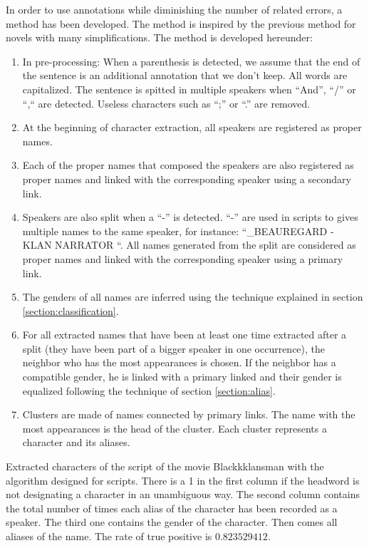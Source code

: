 \documentclass[a4paper, 12pt]{report}
\begin{document}
In order to use annotations while diminishing the number of related errors, a method has been developed.
The method is inspired by the previous method for novels with many simplifications. The method is developed hereunder:
\begin{enumerate}
\item In pre-processing: When a parenthesis is detected, we assume that the end of the sentence is an additional annotation that we don't keep. All words are capitalized. The sentence is spitted in multiple speakers when ``And'', ``/'' or ``,`` are detected. Useless characters such as ``;'' or ``.'' are removed.
\item At the beginning of character extraction, all speakers are registered as proper names.
\item Each of the proper names that composed the speakers are also registered as proper names and linked with the corresponding speaker using a secondary link.
\item Speakers are also split when a ``-'' is detected. ``-'' are used in scripts to gives multiple names to the same speaker, for instance: ``_BEAUREGARD - KLAN NARRATOR ``.
All names generated from the split are considered as proper names and linked with the corresponding speaker using a primary link.
\item The genders of all names are inferred using the technique explained in section \ref{section:classification}.
\item For all extracted names that have been at least one time extracted after a split (they have been part of a bigger speaker in one occurrence), the neighbor who has the most appearances is chosen. If the neighbor has a compatible gender, he is linked with a primary linked and their gender is equalized following the technique of section \ref{section:alias}.
\item Clusters are made of names connected by primary links. The name with the most appearances is the head of the cluster. Each cluster represents a character and its aliases.
\end{enumerate}


\begin{table}[]
\caption{Extracted characters of the script of the movie Blackkklansman with the algorithm designed for scripts.
There is a 1 in the first column if the headword is not designating a character in an unambiguous way.
The second column contains the total number of times each alias of the character has been recorded as a speaker.
The third one contains the gender of the character. Then comes all aliases of the name. The rate of true positive is $0.823529412$.}
\label{character_bkm}
\end{table}
\end{document}
